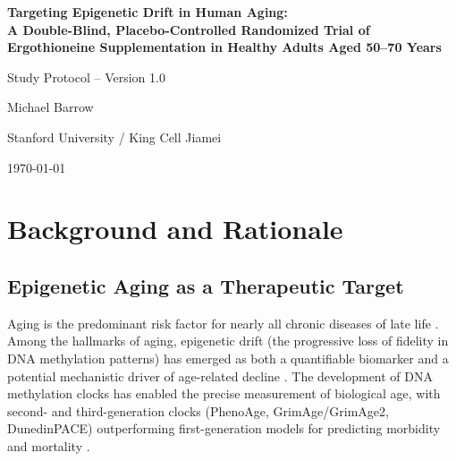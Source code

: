 \documentclass[11pt,a4paper]{article}
\begin{document}
\begin{titlepage}
\centering
\vspace*{3cm}

{\LARGE\bfseries Targeting Epigenetic Drift in Human Aging:\\[4pt]
A Double-Blind, Placebo-Controlled Randomized Trial of\\[4pt]
Ergothioneine Supplementation in Healthy Adults Aged 50--70 Years}

\vspace{2cm}

{\large Study Protocol -- Version 1.0}

\vspace{1.5cm}

{\large Michael Barrow}

\vspace{0.5cm}
{\large Stanford University / King Cell Jiamei}

\vspace{2cm}
{\large \today}

\vspace{4cm}
\end{titlepage}

\newpage
\tableofcontents
\newpage

\section{Background and Rationale}

\subsection{Epigenetic Aging as a Therapeutic Target}

Aging is the predominant risk factor for nearly all chronic diseases of late life \cite{aroddd2025,natureaging2025}. Among the hallmarks of aging, epigenetic drift (the progressive loss of fidelity in DNA methylation patterns) has emerged as both a quantifiable biomarker and a potential mechanistic driver of age-related decline \cite{horvath2013, brunet2023}. The development of DNA methylation clocks has enabled the precise measurement of biological age, with second- and third-generation clocks (PhenoAge, GrimAge/GrimAge2, DunedinPACE) outperforming first-generation models for predicting morbidity and mortality \cite{levine2018, lu2019, belsky2022, tan2026}.
\end{document}
